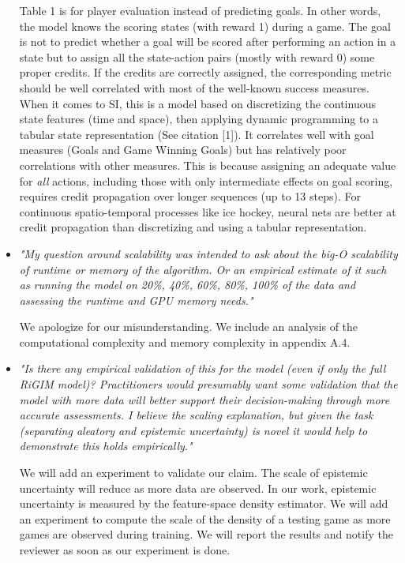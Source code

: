 \documentclass[letterpaper]{article} %
\begin{document}
\begin{itemize}
    Table 1 is for player evaluation instead of predicting goals. In other words, the model knows the scoring states (with reward 1)  during a game. The goal is not to predict whether a goal will be scored after performing an action in a state but to assign all the state-action pairs (mostly with reward 0) some proper credits. If the credits are correctly assigned, the corresponding metric should be well correlated with most of the well-known success measures.
    When it comes to SI, this is a model based on discretizing the continuous state features (time and space), then applying dynamic programming to a tabular state representation (See citation [1]).
    It correlates well with goal measures (Goals and Game Winning Goals) but has relatively poor correlations with other measures. This is because assigning an adequate value for {\em all} actions, including those with only intermediate effects on goal scoring, requires credit propagation over longer sequences (up to 13 steps). For continuous spatio-temporal processes like ice hockey, neural nets are better at credit propagation than discretizing and using a tabular representation.
    \medskip
    
    \item{\it "My question around scalability was intended to ask about the big-O scalability of runtime or memory of the algorithm. Or an empirical estimate of it such as running the model on 20\%, 40\%, 60\%, 80\%, 100\% of the data and assessing the runtime and GPU memory needs."}

    We apologize for our misunderstanding. We include an analysis of the computational complexity and memory complexity in appendix A.4.
    \medskip

   \item{\it "Is there any empirical validation of this for the model (even if only the full RiGIM model)? Practitioners would presumably want some validation that the model with more data will better support their decision-making through more accurate assessments. I believe the scaling explanation, but given the task (separating aleatory and epistemic uncertainty) is novel it would help to demonstrate this holds empirically."}

    We will add an experiment to validate our claim. The scale of epistemic uncertainty will reduce as more data are observed. In our work, epistemic uncertainty is measured by the feature-space density estimator. We will add an experiment to compute the scale of the density of a testing game as more games are observed during training. We will report the results and notify the reviewer as soon as our experiment is done. 
    \medskip
\end{itemize}
\end{document}
